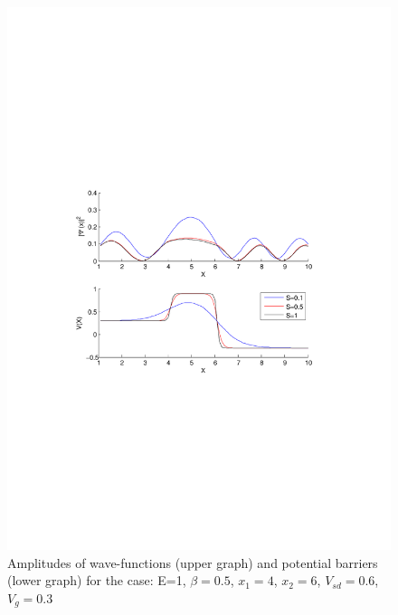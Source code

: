 \documentclass[a4paper]{article}
\begin{document}
\begin{figure}[h!]
\centering
\includegraphics[scale=0.85, trim = 35mm 100mm 35mm 100mm, clip]{test2}
\caption{Amplitudes of wave-functions (upper graph) and potential barriers (lower graph) for the case: E=1, $\beta=0.5$, $x_1=4$, $x_2=6$, $V_{sd}=0.6$, $V_g=0.3$}
\label{fig:test2}
\end{figure}
\newpage
\end{document}
